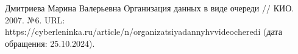 \begin{thebibliography}{}
	 Дмитриева Марина Валерьевна Организация данных в виде очереди // КИО. 2007. №6. URL: https://cyberleninka.ru/article/n/organizatsiyadannyhvvideocheredi (дата обращения: 25.10.2024).
\end{thebibliography}
